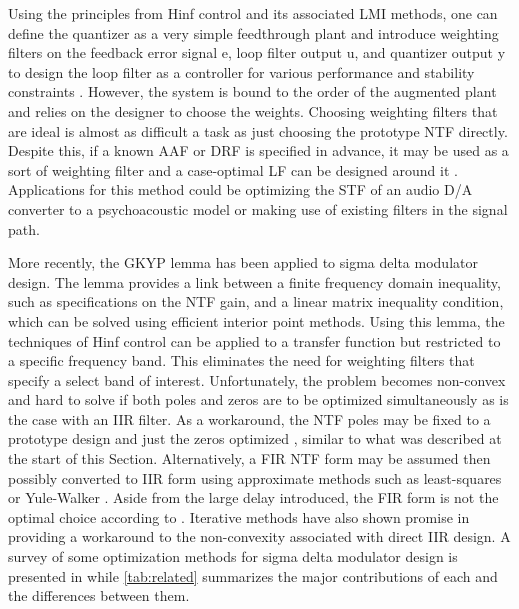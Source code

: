 Using the principles from \gls{Hinf} control and its associated \gls{LMI} methods, one can define the quantizer as a very simple feedthrough plant and introduce weighting filters on the feedback error signal \gls{e}, loop filter output \gls{u}, and quantizer output \gls{y} to design the loop filter as a controller for various performance and stability constraints \cite{Oberoi2004}. However, the system is bound to the order of the augmented plant and relies on the designer to choose the weights. Choosing weighting filters that are ideal is almost as difficult a task as just choosing the prototype \gls{NTF} directly. Despite this, if a known \gls{AAF} or \gls{DRF} is specified in advance, it may be used as a sort of weighting filter and a case-optimal \gls{LF} can be designed around it \cite{Ohno2017b}. Applications for this method could be optimizing the \gls{STF} of an audio \gls{D/A} converter to a psychoacoustic model or making use of existing filters in the signal path.

More recently, the \gls{GKYP} lemma has been applied to sigma delta modulator design. The lemma provides a link between a finite frequency domain inequality, such as specifications on the \gls{NTF} gain, and a linear matrix inequality condition, which can be solved using efficient interior point methods. Using this lemma, the techniques of \gls{Hinf} control can be applied to a transfer function but restricted to a specific frequency band. This eliminates the need for weighting filters that specify a select band of interest. Unfortunately, the problem becomes non-convex and hard to solve if both poles and zeros are to be optimized simultaneously as is the case with an \gls{IIR} filter. As a workaround, the \gls{NTF} poles may be fixed to a prototype design and just the zeros optimized \cite{Osqui2007}, similar to what was described at the start of this Section. Alternatively, a \gls{FIR} \gls{NTF} form may be assumed \cite{Nagahara2012, Tariq2016} then possibly converted to \gls{IIR} form using approximate methods such as least-squares or Yule-Walker \cite{Tariq2017}. Aside from the large delay introduced, the \gls{FIR} form is not the optimal choice according to \cite{Derpich2008}. Iterative methods have also shown promise in providing a workaround to the non-convexity associated with direct \gls{IIR} design. A survey of some optimization methods for sigma delta modulator design is presented in \cite{Callegari2015} while \autoref{tab:related} summarizes the major contributions of each and the differences between them.

